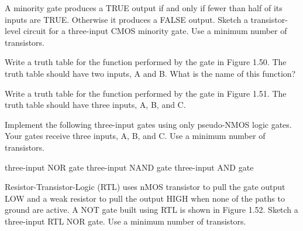 \exercise %
A minority gate produces a TRUE output if and only if fewer than half of its inputs are TRUE.
Otherwise it produces a FALSE output. Sketch a transistor-level circuit for a three-input CMOS
minority gate. Use a minimum number of transistors.

\exercise %
Write a truth table for the function performed by the gate in Figure 1.50. The truth table should
have two inputs, A and B. What is the name of this function?

\exercise %
Write a truth table for the function performed by the gate in Figure 1.51. The truth table should
have three inputs, A, B, and C.

\exercise %
Implement the following three-input gates using only pseudo-NMOS logic gates. Your gates receive
three inputs, A, B, and C. Use a minimum number of transistors.
\begin{tasks}
	\task three-input NOR gate
	\task three-input NAND gate
	\task three-input AND gate
\end{tasks}

\exercise %
Resistor-Transistor-Logic (RTL) uses nMOS transistor to pull the gate output LOW and a weak
resistor to pull the output HIGH when none of the paths to ground are active. A NOT gate built
using RTL is shown in Figure 1.52. Sketch a three-input RTL NOR gate. Use a minimum number of
transistors.
